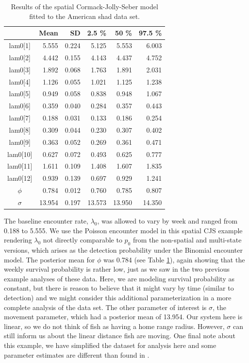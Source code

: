 \begin{table}
\centering
\caption{
Results of the spatial Cormack-Jolly-Seber model fitted to the 
American shad data set.
}
\begin{tabular}{crrrrr}
\hline \hline
&       Mean   &  SD  &  2.5 \%   &   50 \%    &  97.5 \% \\
\hline
lam0[1] &  5.555& 0.224  & 5.125 & 5.553 	& 6.003 \\
lam0[2] &  4.442& 0.155  & 4.143 & 4.437  & 4.752 \\
lam0[3] &  1.892& 0.068  & 1.763 & 1.891  & 2.031 \\
lam0[4] &  1.126& 0.055  & 1.021 & 1.125  & 1.238 \\
lam0[5] &  0.949& 0.058  & 0.838 & 0.948 & 1.067 \\
lam0[6] &  0.359& 0.040  & 0.284 & 0.357 & 0.443 \\
lam0[7] &  0.188& 0.031  & 0.133 & 0.186 &  0.254 \\
lam0[8] &  0.309 &0.044  & 0.230  & 0.307  & 0.402 \\
lam0[9]  & 0.363 &0.052 &  0.269 &  0.361 & 0.471 \\
lam0[10] & 0.627 &0.072  & 0.493  & 0.625  & 0.777 \\
lam0[11] & 1.611 &0.109  & 1.408  & 1.607  & 1.835 \\
lam0[12] & 0.939 &0.139 & 0.697  & 0.929  & 1.241 \\
$\phi$  &  0.784 &0.012  & 0.760  & 0.785  & 0.807 \\
$\sigma$ & 13.954& 0.197  & 13.573 & 13.950  & 14.350\\
\hline
\end{tabular}
\label{open.tab.shad1}
\end{table}

The baseline encounter rate, $\lambda_0$, was allowed to vary by week
and ranged from 0.188 to 5.555.  We use the Poisson encounter model in
this spatial CJS example rendering $\lambda_0$ not directly comparable
to $p_0$ from the non-spatial and multi-state versions, which arises as
the detection probability under the Binomial encounter model.
The posterior mean for $\phi$ was
0.784 (see Table \ref{open.tab.shad1}), again showing that the weekly
survival probability is rather low, just as we saw in the two
previous example analyses of these data.  Here, we are modeling
survival probability as constant, but there is reason to believe that
it might vary by time (similar to detection) and we might consider
this additional parameterization in a more complete analysis of the
data set. The other parameter of interest is $\sigma$, the movement
parameter, which had a posterior mean of 13.954.  
Our system here is
linear, so we do not think of fish as having a home range radius.
  However, $\sigma$ can still inform us about the linear
distance fish are moving.  One final note about this example, we have
simplified the dataset for analysis here and some parameter estimates
are different than found in \citet{raabe_diss:2012}.


